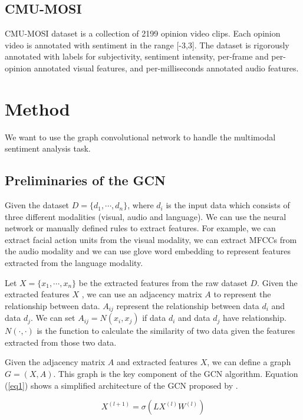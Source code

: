 \documentclass[11pt]{article}
\begin{document}
\subsection{CMU-MOSI}
CMU-MOSI dataset is a collection of 2199 opinion video clips. Each opinion video is annotated with sentiment in the range [-3,3]. The dataset is rigorously annotated with labels for subjectivity, sentiment intensity, per-frame and per-opinion annotated visual features, and per-milliseconds annotated audio features.

\section{Method}

We want to use the graph convolutional network to handle the multimodal sentiment analysis task.

\subsection{Preliminaries of the GCN}

Given the dataset $D = \{d_1,\cdots,d_n \}$, where $d_i$ is the input data which consists of three different modalities (visual, audio and language). We can use the neural network or manually defined rules to extract features. For example, we can extract facial action units from the visual modality, we can extract MFCCs from the audio modality and we can use glove word embedding to represent features extracted from the language modality.

Let $X = \{x_1,\cdots,x_n \}$ be the extracted features from the raw dataset $D$. Given the extracted features $X$ , we can use an adjacency matrix $A$ to represent the relationship between data. $A_{ij}$ represent the relationship between data $d_i$ and data $d_j$. We can set $A_{ij} = N(x_i, x_j)$ if data $d_i$ and data $d_j$ have relationship. $N(\cdot,\cdot)$ is the function to calculate the similarity of two data given the features extracted from those two data. 

Given the adjacency matrix $A$ and extracted features $X$, we can define a graph $G = (X, A)$. This graph is the key component of the GCN algorithm. Equation (\ref{eq1}) shows a simplified architecture of the GCN proposed by \cite{kipf2017semi}.

\begin{equation}
X^{(l+1)}=\sigma (LX^{(l)}W^{(l)})
\label{eq1}
\end{equation}
\end{document}
